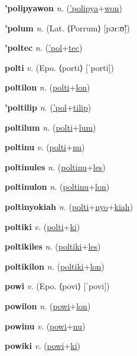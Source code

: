\textbf{\hypertarget{'polipyawon}{'polipyawon}} \textit{n.} (\hyperlink{'polipya}{'polipya}+\allowbreak \hyperlink{won}{won})


\textbf{\hypertarget{'polum}{'polum}} \textit{n.} (Lat. ⟨Porrum⟩ [pɔrːʊ̃])


\textbf{\hypertarget{'poltec}{'poltec}} \textit{n.} (\hyperlink{'pol}{'pol}+\allowbreak \hyperlink{tec}{tec})


\textbf{\hypertarget{polti}{polti}} \textit{v.} (Epo. ⟨porti⟩ [ˈporti])


\textbf{\hypertarget{poltilon}{poltilon}} \textit{n.} (\hyperlink{polti}{polti}+\allowbreak \hyperlink{lon}{lon})


\textbf{\hypertarget{'poltilip}{'poltilip}} \textit{n.} (\hyperlink{'pol}{'pol}+\allowbreak \hyperlink{tilip}{tilip})


\textbf{\hypertarget{poltilum}{poltilum}} \textit{n.} (\hyperlink{polti}{polti}+\allowbreak \hyperlink{lum}{lum})


\textbf{\hypertarget{poltinu}{poltinu}} \textit{v.} (\hyperlink{polti}{polti}+\allowbreak \hyperlink{nu}{nu})


\textbf{\hypertarget{poltinules}{poltinules}} \textit{n.} (\hyperlink{poltinu}{poltinu}+\allowbreak \hyperlink{les}{les})


\textbf{\hypertarget{poltinulon}{poltinulon}} \textit{n.} (\hyperlink{poltinu}{poltinu}+\allowbreak \hyperlink{lon}{lon})


\textbf{\hypertarget{poltinyokiah}{poltinyokiah}} \textit{n.} (\hyperlink{polti}{polti}+\allowbreak \hyperlink{nyo}{nyo}+\allowbreak \hyperlink{kiah}{kiah})


\textbf{\hypertarget{poltiki}{poltiki}} \textit{v.} (\hyperlink{polti}{polti}+\allowbreak \hyperlink{ki}{ki})


\textbf{\hypertarget{poltikiles}{poltikiles}} \textit{n.} (\hyperlink{poltiki}{poltiki}+\allowbreak \hyperlink{les}{les})


\textbf{\hypertarget{poltikilon}{poltikilon}} \textit{n.} (\hyperlink{poltiki}{poltiki}+\allowbreak \hyperlink{lon}{lon})


\textbf{\hypertarget{powi}{powi}} \textit{v.} (Epo. ⟨povi⟩ [ˈpovi])


\textbf{\hypertarget{powilon}{powilon}} \textit{n.} (\hyperlink{powi}{powi}+\allowbreak \hyperlink{lon}{lon})


\textbf{\hypertarget{powinu}{powinu}} \textit{v.} (\hyperlink{powi}{powi}+\allowbreak \hyperlink{nu}{nu})


\textbf{\hypertarget{powiki}{powiki}} \textit{v.} (\hyperlink{powi}{powi}+\allowbreak \hyperlink{ki}{ki})


